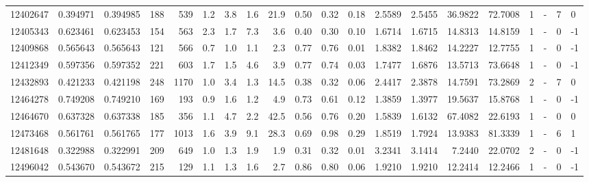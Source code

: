 \begin{tabular}{rrrrrrrrrrrrrrrrrlrl}
  12402647 & 0.394971 &   0.394985 &  188 &  539 &      1.2 &      3.8 &     1.6 &     21.9 &       0.50 &        0.32 &        0.18 &  2.5589 &  2.5455 &   36.9822 &   72.7008 &       1 &             - &        7 &         0 \\
  12405343 & 0.623461 &   0.623453 &  154 &  563 &      2.3 &      1.7 &     7.3 &      3.6 &       0.40 &        0.30 &        0.10 &  1.6714 &  1.6715 &   14.8313 &   14.8159 &       1 &             - &        0 &        -1 \\
  12409868 & 0.565643 &   0.565643 &  121 &  566 &      0.7 &      1.0 &     1.1 &      2.3 &       0.77 &        0.76 &        0.01 &  1.8382 &  1.8462 &   14.2227 &   12.7755 &       1 &             - &        0 &        -1 \\
  12412349 & 0.597356 &   0.597352 &  221 &  603 &      1.7 &      1.5 &     4.6 &      3.9 &       0.77 &        0.74 &        0.03 &  1.7477 &  1.6876 &   13.5713 &   73.6648 &       1 &             - &        0 &        -1 \\
  12432893 & 0.421233 &   0.421198 &  248 & 1170 &      1.0 &      3.4 &     1.3 &     14.5 &       0.38 &        0.32 &        0.06 &  2.4417 &  2.3878 &   14.7591 &   73.2869 &       2 &             - &        7 &         0 \\
  12464278 & 0.749208 &   0.749210 &  169 &  193 &      0.9 &      1.6 &     1.2 &      4.9 &       0.73 &        0.61 &        0.12 &  1.3859 &  1.3977 &   19.5637 &   15.8768 &       1 &             - &        0 &        -1 \\
  12464670 & 0.637328 &   0.637338 &  185 &  356 &      1.1 &      4.7 &     2.2 &     42.5 &       0.56 &        0.76 &        0.20 &  1.5839 &  1.6132 &   67.4082 &   22.6193 &       1 &             - &        0 &         0 \\
  12473468 & 0.561761 &   0.561765 &  177 & 1013 &      1.6 &      3.9 &     9.1 &     28.3 &       0.69 &        0.98 &        0.29 &  1.8519 &  1.7924 &   13.9383 &   81.3339 &       1 &             - &        6 &         1 \\
  12481648 & 0.322988 &   0.322991 &  209 &  649 &      1.0 &      1.3 &     1.9 &      1.9 &       0.31 &        0.32 &        0.01 &  3.2341 &  3.1414 &    7.2440 &   22.0702 &       2 &             - &        0 &        -1 \\
  12496042 & 0.543670 &   0.543672 &  215 &  129 &      1.1 &      1.3 &     1.6 &      2.7 &       0.86 &        0.80 &        0.06 &  1.9210 &  1.9210 &   12.2414 &   12.2466 &       1 &             - &        0 &        -1 \\

\end{tabular}
